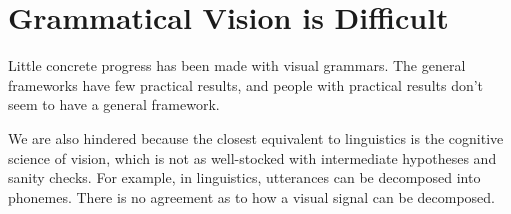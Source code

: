 








\section{Grammatical Vision is Difficult}

Little concrete progress has been made with visual grammars. The
general frameworks have few practical results, and people with
practical results don't seem to have a general framework.  

We are also hindered because the closest equivalent to linguistics is
the cognitive science of vision, which is not as well-stocked with
intermediate hypotheses and sanity checks. For example, in
linguistics, utterances can be decomposed into phonemes. There is no
agreement as to how a visual signal can be decomposed.

